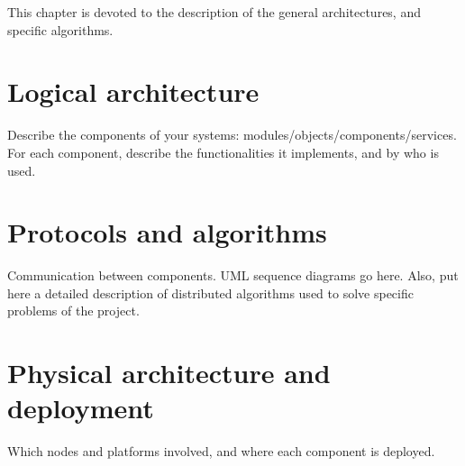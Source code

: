 This chapter is devoted to the description of the general
architectures, and specific algorithms.

\section{Logical architecture}
\label{sec:logical-arch}
Describe the components of your systems:
modules/objects/components/services.
For each component, describe the functionalities it implements,
and by who is used.

\section{Protocols and algorithms}
\label{sec:protocols}
Communication between components.
UML sequence diagrams go here.
Also, put here a detailed description of distributed algorithms
used to solve specific problems of the project.

\section{Physical architecture and deployment}
\label{sec:deploy}
Which nodes and platforms involved, and where each
component is deployed.

